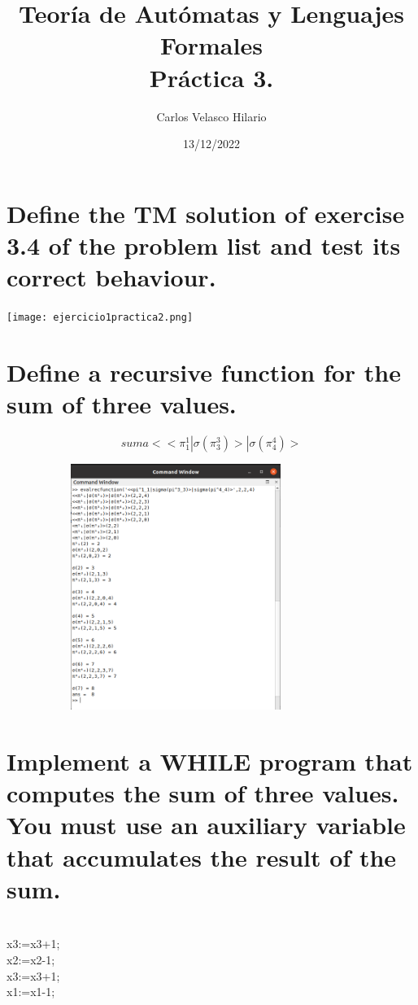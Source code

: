 \documentclass[fleqn, 10pt]{article}
\title{Teoría de Autómatas y Lenguajes Formales\\[.4\baselineskip]Práctica 3.}
\author{Carlos Velasco Hilario}
\date{13/12/2022}
\theoremstyle{plain}
\theoremstyle{definition}
\begin{document}
\maketitle

\section{Define the TM solution of exercise 3.4 of the problem list and test its correct behaviour. }

\begin{center}
\texttt{[image: ejercicio1practica2.png]}
\end{center}
\section {Define a recursive function for the sum of three values.}

\begin{equation}
suma <<\pi^1_1|\sigma(\pi^3_3)>|\sigma(\pi^4_4)>
\end {equation}

\includegraphics[width=11cm, height=8cm] {practica3ej2.png}

\begin{center}
\end{center}
\section {Implement a WHILE program that computes the sum of three values. You must use an auxiliary variable that accumulates the result of the sum.}
\begin{algorithmic}

	\\x3:=x3+1;
	\\x2:=x2-1;
\EndWhile
\\x3:=x3+1;
\\x1:=x1-1;
\EndWhile
\end{algorithmic}
\end{document}
